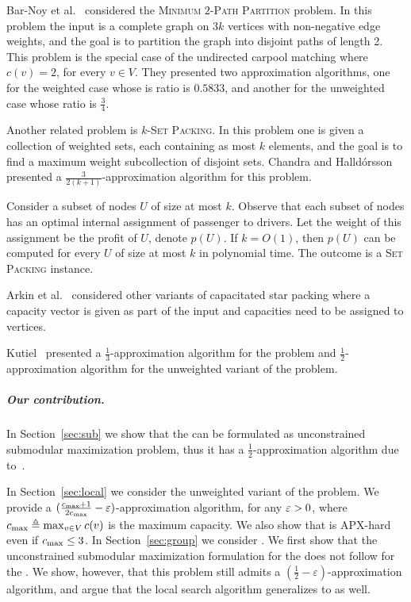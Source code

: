 Bar-Noy et al.~\cite{bar2015improved} considered the
\textsc{Minimum $2$-Path Partition} problem.
In this problem the input is a complete graph on $3k$ vertices with
non-negative edge weights, and the goal is to partition the graph into
disjoint paths of length 2.  This problem is the special case of the
undirected carpool matching where $c(v) = 2$, for every $v \in V$.
They presented two approximation algorithms, one for the weighted case
whose is ratio is $0.5833$, and another for the unweighted case whose
ratio is $\frac{3}{4}$.

Another related problem is \textsc{$k$-Set Packing}.  In this problem
one is given a collection of weighted sets, each containing as most
$k$ elements, and the goal is to find a maximum weight subcollection
of disjoint sets.  Chandra and Halld\'orsson~\cite{chandra2001greedy}
presented a $\frac{3}{2(k+1)}$-approximation algorithm for this
problem.




Consider a subset of
nodes $U$ of size at most $k$.  Observe that each subset of nodes has
an optimal internal assignment of passenger to drivers.  Let the
weight of this assignment be the profit of $U$, denote $p(U)$.  If $k
= O(1)$, then $p(U)$ can be computed for every $U$ of size at most $k$
in polynomial time.  The outcome is a \textsc{Set Packing} instance.



Arkin et al.~\cite{arkin2004approximations} considered other variants
of capacitated star packing where a capacity vector is given as part
of the input and capacities need to be assigned to vertices.



Kutiel~\cite{kutiel2016} presented a $\frac{1}{3}$-approximation
algorithm for the problem and $\frac{1}{2}$-approximation algorithm for the
unweighted variant of the problem.





\subparagraph{Our contribution.}
%
In Section~\ref{sec:sub} we show that the \carpool can be formulated
as unconstrained submodular maximization problem, thus it has a
$\frac{1}{2}$-approximation algorithm due
to~\cite{BFNS15,buchbinder2016deterministic}.

In Section~\ref{sec:local} we consider the unweighted variant of the
problem.  We provide a $(\frac{c_{\max}+1}{2c_{\max}} - \varepsilon)$-approximation
algorithm, for any $\varepsilon>0$, where $c_{\max} \triangleq \max_{v \in V} c(v)$
is the maximum capacity.  We also show that \carpool is APX-hard even
if $c_{\max} \leq 3$.
%
In Section~\ref{sec:group} we consider \gcp.  
We first show that the unconstrained submodular maximization formulation for
the \carpool does not follow for the \gcp.
We show, however, that this problem still admits
a $(\frac{1}{2} -\varepsilon)$-approximation algorithm, and argue that the local
search algorithm generalizes to \gcp as well.
